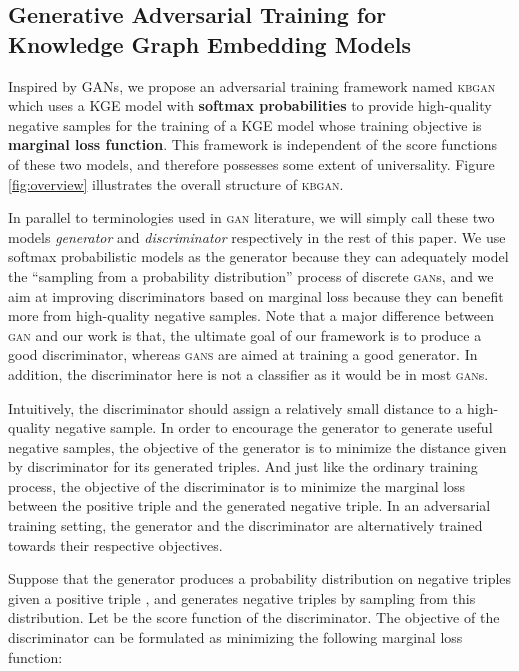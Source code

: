 \documentclass[11pt,a4paper]{article}
\begin{document}
\subsection{Generative Adversarial Training for\\ Knowledge Graph Embedding Models}

Inspired by GANs, we propose an adversarial training framework named \textsc{kbgan} which uses a KGE model with \textbf{softmax probabilities} to provide high-quality negative samples for the training of a KGE model whose training objective is \textbf{marginal loss function}. This framework is independent of the score functions of these two models, and therefore possesses some extent of universality. Figure \ref{fig:overview} illustrates the overall structure of \textsc{kbgan}.

In parallel to terminologies used in \textsc{gan} literature, we will simply call these two models \emph{generator} and \emph{discriminator} respectively in the rest of this paper. We use softmax probabilistic models as the generator because they can adequately model the ``sampling from a probability distribution'' process of discrete \textsc{gan}s, and we aim at improving discriminators based on marginal loss because they can benefit more from high-quality negative samples. Note that a major difference between \textsc{gan} and our work is that, the ultimate goal of our framework is to produce a good discriminator, whereas \textsc{gans} are aimed at training a good generator. In addition, the discriminator here is not a classifier as it would be in most \textsc{gan}s. 

Intuitively, the discriminator should assign a relatively small distance to a high-quality negative sample. In order to encourage the generator to generate useful negative samples, the objective of the generator is to minimize the distance given by discriminator for its generated triples. And just like the ordinary training process, the objective of the discriminator is to minimize the marginal loss between the positive triple and the generated negative triple. In an adversarial training setting, the generator and the discriminator are alternatively trained towards their respective objectives.

Suppose that the generator produces a probability distribution on negative triples  given a positive triple , and generates negative triples  by sampling from this distribution. Let  be the score function of the discriminator. The objective of the discriminator can be formulated as minimizing the following marginal loss function:
\end{document}
